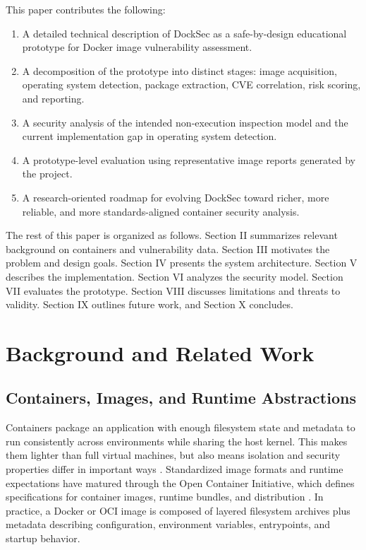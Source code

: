 \documentclass[12pt,draftclsnofoot,onecolumn]{IEEEtran}
\begin{document}
This paper contributes the following:
\begin{enumerate}
  \item A detailed technical description of DockSec as a safe-by-design educational prototype for Docker image vulnerability assessment.
  \item A decomposition of the prototype into distinct stages: image acquisition, operating system detection, package extraction, CVE correlation, risk scoring, and reporting.
  \item A security analysis of the intended non-execution inspection model and the current implementation gap in operating system detection.
  \item A prototype-level evaluation using representative image reports generated by the project.
  \item A research-oriented roadmap for evolving DockSec toward richer, more reliable, and more standards-aligned container security analysis.
\end{enumerate}

The rest of this paper is organized as follows. Section II summarizes relevant background on containers and vulnerability data. Section III motivates the problem and design goals. Section IV presents the system architecture. Section V describes the implementation. Section VI analyzes the security model. Section VII evaluates the prototype. Section VIII discusses limitations and threats to validity. Section IX outlines future work, and Section X concludes.

\section{Background and Related Work}
\subsection{Containers, Images, and Runtime Abstractions}
Containers package an application with enough filesystem state and metadata to run consistently across environments while sharing the host kernel. This makes them lighter than full virtual machines, but also means isolation and security properties differ in important ways \cite{merkel2014docker}. Standardized image formats and runtime expectations have matured through the Open Container Initiative, which defines specifications for container images, runtime bundles, and distribution \cite{ocioverview,ociimage}. In practice, a Docker or OCI image is composed of layered filesystem archives plus metadata describing configuration, environment variables, entrypoints, and startup behavior.
\end{document}
